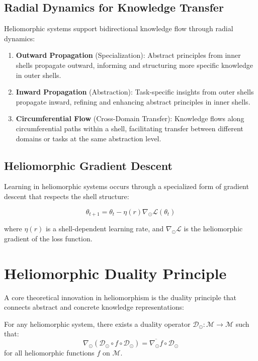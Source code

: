 \subsection{Radial Dynamics for Knowledge Transfer}

Heliomorphic systems support bidirectional knowledge flow through radial dynamics:

\begin{enumerate}
    \item \textbf{Outward Propagation} (Specialization): Abstract principles from inner shells propagate outward, informing and structuring more specific knowledge in outer shells.
    
    \item \textbf{Inward Propagation} (Abstraction): Task-specific insights from outer shells propagate inward, refining and enhancing abstract principles in inner shells.
    
    \item \textbf{Circumferential Flow} (Cross-Domain Transfer): Knowledge flows along circumferential paths within a shell, facilitating transfer between different domains or tasks at the same abstraction level.
\end{enumerate}

\subsection{Heliomorphic Gradient Descent}

Learning in heliomorphic systems occurs through a specialized form of gradient descent that respects the shell structure:

\begin{equation}
\theta_{t+1} = \theta_t - \eta(r) \nabla_{\odot} \mathcal{L}(\theta_t)
\end{equation}

where $\eta(r)$ is a shell-dependent learning rate, and $\nabla_{\odot} \mathcal{L}$ is the heliomorphic gradient of the loss function.

\section{Heliomorphic Duality Principle}

A core theoretical innovation in heliomorphism is the duality principle that connects abstract and concrete knowledge representations:

\begin{theorem}
For any heliomorphic system, there exists a duality operator $\mathcal{D}_{\odot}: \mathcal{M} \rightarrow \mathcal{M}$ such that:
\begin{equation}
\nabla_{\odot} (\mathcal{D}_{\odot} \circ f \circ \mathcal{D}_{\odot}) = \overline{\nabla_{\odot} f} \circ \mathcal{D}_{\odot}
\end{equation}
for all heliomorphic functions $f$ on $\mathcal{M}$.
\end{theorem}

